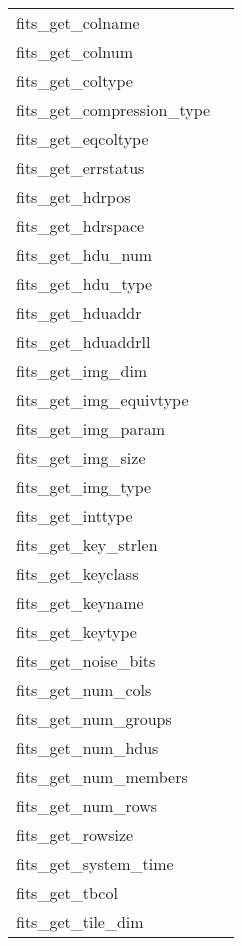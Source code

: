 \documentclass[11pt]{book}
\begin{document}
\begin{tabular}{lr}
fits\_get\_colname    & \pageref{ffgcnn} \\
fits\_get\_colnum     & \pageref{ffgcno} \\
fits\_get\_coltype    & \pageref{ffgtcl} \\
fits\_get\_compression\_type & \pageref{ffgetcomp} \\
fits\_get\_eqcoltype    & \pageref{ffgtcl} \\
fits\_get\_errstatus  & \pageref{ffgerr} \\
fits\_get\_hdrpos        & \pageref{ffghps} \\
fits\_get\_hdrspace      & \pageref{ffghsp} \\
fits\_get\_hdu\_num    & \pageref{ffghdn} \\
fits\_get\_hdu\_type   & \pageref{ffghdt} \\
fits\_get\_hduaddr    & \pageref{ffghad} \\
fits\_get\_hduaddrll    & \pageref{ffghad} \\
fits\_get\_img\_dim & \pageref{ffgidm} \\
fits\_get\_img\_equivtype & \pageref{ffgidt} \\
fits\_get\_img\_param & \pageref{ffgipr} \\
fits\_get\_img\_size & \pageref{ffgisz} \\
fits\_get\_img\_type & \pageref{ffgidt} \\
fits\_get\_inttype    & \pageref{ffinttyp} \\
fits\_get\_key\_strlen & \pageref{ffgksl} \\
fits\_get\_keyclass    & \pageref{ffgkcl} \\
fits\_get\_keyname    & \pageref{ffgknm} \\
fits\_get\_keytype    & \pageref{ffdtyp} \\
fits\_get\_noise\_bits   & \pageref{ffgetcomp} \\
fits\_get\_num\_cols     & \pageref{ffgnrw} \\
fits\_get\_num\_groups  & \pageref{ffgmng} \\
fits\_get\_num\_hdus   & \pageref{ffthdu} \\
fits\_get\_num\_members  & \pageref{ffgtnm} \\
fits\_get\_num\_rows     & \pageref{ffgnrw} \\
fits\_get\_rowsize    & \pageref{ffgrsz} \\
fits\_get\_system\_time  & \pageref{ffdt2s} \\
fits\_get\_tbcol      & \pageref{ffgabc} \\
fits\_get\_tile\_dim     & \pageref{ffgetcomp} \\
\end{tabular}
\end{document}
